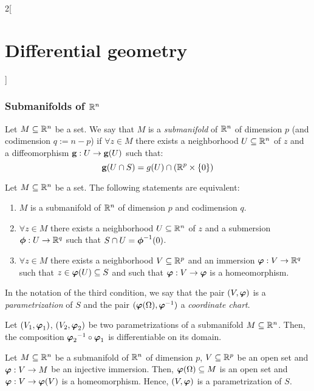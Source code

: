 \documentclass[../../../main.tex]{subfiles}
\begin{document}
\begin{multicols}{2}[\section{Differential geometry}]
  \subsubsection{Submanifolds of \texorpdfstring{$\mathbb{R}^n$}{Rn}}
  \begin{definition}
    Let $M\subseteq\mathbb{R}^n$ be a set. We say that $M$ is a \emph{submanifold} of $\mathbb{R}^n$ of dimension $p$ (and codimension $q:=n-p$) if $\forall z\in M$ there exists a neighborhood $U\subseteq \mathbb{R}^n$ of $z$ and a diffeomorphism $\boldsymbol{\mathrm{g}}:U\rightarrow\boldsymbol{\mathrm{g}}(U)$ such that: $$\boldsymbol{\mathrm{g}}(U\cap S)=g(U)\cap\left(\mathbb{R}^p\times\{0\}\right)$$
  \end{definition}
  \begin{theorem}
    Let $M\subseteq\mathbb{R}^n$ be a set. The following statements are equivalent:
    \begin{enumerate}
      \item $M$ is a submanifold of $\mathbb{R}^n$ of dimension $p$ and codimension $q$.
      \item $\forall z\in M$ there exists a neighborhood $U\subseteq \mathbb{R}^n$ of $z$ and a submersion $\boldsymbol{\mathrm{\phi}}:U\rightarrow\mathbb{R}^q$ such that $S\cap U={\boldsymbol{\mathrm{\phi}}}^{-1}(0)$.
      \item $\forall z\in M$ there exists a neighborhood $V\subseteq \mathbb{R}^p$ and an immersion $\boldsymbol{\mathrm{\varphi}}:V\rightarrow\mathbb{R}^q$ such that $z\in\boldsymbol{\mathrm{\varphi}}(U)\subseteq S$ and such that $\boldsymbol{\mathrm{\varphi}}:V\rightarrow\boldsymbol{\mathrm{\varphi}}$ is a homeomorphism.
    \end{enumerate}
    In the notation of the third condition, we say that the pair $(V,\boldsymbol{\mathrm{\varphi}})$ is a \emph{parametrization} of $S$ and the pair $(\boldsymbol{\mathrm{\varphi}}(\Omega),{\boldsymbol{\mathrm{\varphi}}}^{-1})$ a \emph{coordinate chart}.
  \end{theorem}
  \begin{proposition}
    Let $(V_1,\boldsymbol{\mathrm{\varphi}}_1)$, $(V_2,\boldsymbol{\mathrm{\varphi}}_2)$ be two parametrizations of a submanifold $M\subseteq\mathbb{R}^n$. Then, the composition ${\boldsymbol{\mathrm{\varphi}}_2}^{-1}\circ\boldsymbol{\mathrm{\varphi}}_1$ is differentiable on its domain.
  \end{proposition}
  \begin{proposition}
    Let $M\subseteq\mathbb{R}^n$ be a submanifold of $\mathbb{R}^n$ of dimension $p$, $V\subseteq\mathbb{R}^p$ be an open set and $\boldsymbol{\mathrm{\varphi}}:V\rightarrow M$ be an injective immersion. Then, $\boldsymbol{\mathrm{\varphi}}(\Omega)\subseteq M$ is an open set and $\boldsymbol{\mathrm{\varphi}}:V\rightarrow \boldsymbol{\mathrm{\varphi}}(V)$ is a homeomorphism. Hence, $(V,\boldsymbol{\mathrm{\varphi}})$ is a parametrization of $S$.
  \end{proposition}

\end{multicols}
\end{document}
